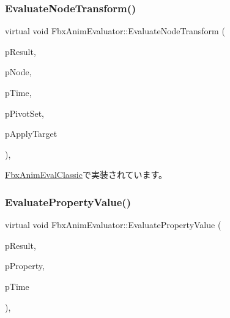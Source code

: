 \subsubsection{\texorpdfstring{Evaluate\+Node\+Transform()}{EvaluateNodeTransform()}}
{\footnotesize\ttfamily virtual void Fbx\+Anim\+Evaluator\+::\+Evaluate\+Node\+Transform (\begin{DoxyParamCaption}\item[{\hyperlink{class_fbx_node_eval_state}{Fbx\+Node\+Eval\+State} $\ast$}]{p\+Result,  }\item[{\hyperlink{class_fbx_node}{Fbx\+Node} $\ast$}]{p\+Node,  }\item[{const \hyperlink{class_fbx_time}{Fbx\+Time} \&}]{p\+Time,  }\item[{\hyperlink{class_fbx_node_ae62b7311ac4727654cdf1ebd5cbf7343}{Fbx\+Node\+::\+E\+Pivot\+Set}}]{p\+Pivot\+Set,  }\item[{bool}]{p\+Apply\+Target }\end{DoxyParamCaption})\hspace{0.3cm}{\ttfamily [protected]}, {}}



\hyperlink{class_fbx_anim_eval_classic_a83f7c6d89964e4ff48e7ad2d325a1eac}{Fbx\+Anim\+Eval\+Classic}で実装されています。

\mbox{\label{class_fbx_anim_evaluator_aa29759ee76b1cbb0ced4fee1508d5d84}} 
\subsubsection{\texorpdfstring{Evaluate\+Property\+Value()}{EvaluatePropertyValue()}}
{\footnotesize\ttfamily virtual void Fbx\+Anim\+Evaluator\+::\+Evaluate\+Property\+Value (\begin{DoxyParamCaption}\item[{\hyperlink{class_fbx_property_eval_state}{Fbx\+Property\+Eval\+State} $\ast$}]{p\+Result,  }\item[{\hyperlink{class_fbx_property}{Fbx\+Property} \&}]{p\+Property,  }\item[{const \hyperlink{class_fbx_time}{Fbx\+Time} \&}]{p\+Time }\end{DoxyParamCaption})\hspace{0.3cm}{\ttfamily [protected]}, {}}



